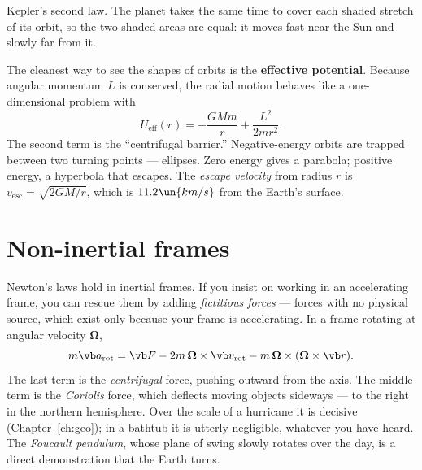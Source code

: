 \begin{center}
\begin{minipage}{\linewidth}

{\small Kepler's second law. The planet takes the same time to cover each shaded stretch of its orbit, so the two shaded areas are equal: it moves fast near the Sun and slowly far from it.}
\end{minipage}
\end{center}

The cleanest way to see the shapes of orbits is the \textbf{effective potential}. Because angular momentum $L$ is conserved, the radial motion behaves like a one-dimensional problem with
\[
  U_{\text{eff}}(r) = -\frac{GMm}{r} + \frac{L^{2}}{2mr^{2}} .
\]
The second term is the ``centrifugal barrier.'' Negative-energy orbits are trapped between two turning points --- ellipses. Zero energy gives a parabola; positive energy, a hyperbola that escapes. The \emph{escape velocity} from radius $r$ is $v_{\text{esc}} = \sqrt{2GM/r}$, which is $11.2\un{km/s}$ from the Earth's surface.

\section{Non-inertial frames}

Newton's laws hold in inertial frames. If you insist on working in an accelerating frame, you can rescue them by adding \emph{fictitious forces} --- forces with no physical source, which exist only because your frame is accelerating. In a frame rotating at angular velocity $\boldsymbol\Omega$,
\[
  m\vb a_{\text{rot}} = \vb F - 2m\,\boldsymbol\Omega\times\vb v_{\text{rot}} - m\,\boldsymbol\Omega\times(\boldsymbol\Omega\times\vb r).
\]
The last term is the \emph{centrifugal} force, pushing outward from the axis. The middle term is the \emph{Coriolis} force, which deflects moving objects sideways --- to the right in the northern hemisphere. Over the scale of a hurricane it is decisive (Chapter~\ref{ch:geo}); in a bathtub it is utterly negligible, whatever you have heard. The \emph{Foucault pendulum}, whose plane of swing slowly rotates over the day, is a direct demonstration that the Earth turns.

